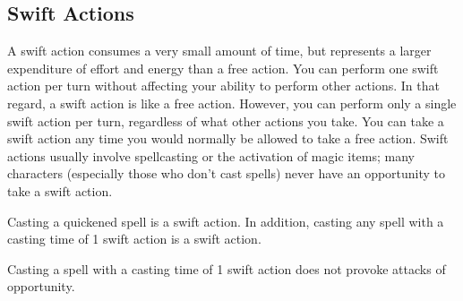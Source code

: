 \subsection{Swift Actions}


A swift action consumes a very small amount of time, but represents a larger expenditure of effort and energy than a free action. You can perform one swift action per turn without affecting your ability to perform other actions. In that regard, a swift action is like a free action. However, you can perform only a single swift action per turn, regardless of what other actions you take. You can take a swift action any time you would normally be allowed to take a free action. Swift actions usually involve spellcasting or the activation of magic items; many characters (especially those who don't cast spells) never have an opportunity to take a swift action.

Casting a quickened spell is a swift action. In addition, casting any spell with a casting time of 1 swift action is a swift action.

Casting a spell with a casting time of 1 swift action does not provoke attacks of opportunity.
